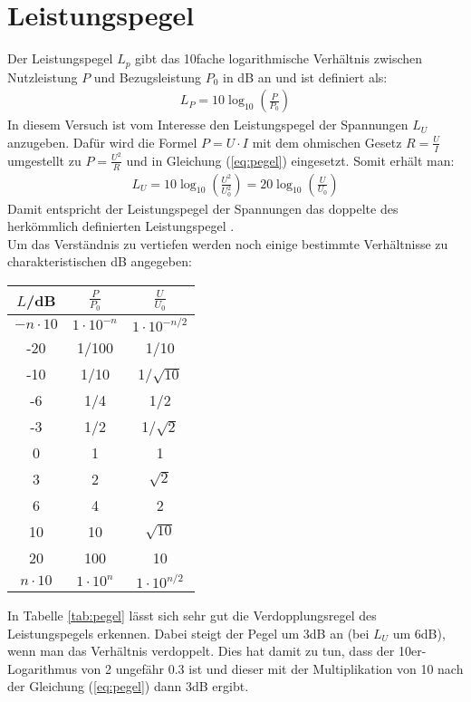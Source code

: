\section{Leistungspegel}
\label{sec:pegel}
Der Leistungspegel $L_p$ gibt das 10fache logarithmische Verhältnis zwischen Nutzleistung $P$ und Bezugsleistung $P_0$ in \si{\deci\bel} an und ist definiert als:
\begin{gather}
    L_P = 10 \log_{10}\left(\frac{P}{P_0}\right)
    \label{eq:pegel}
\end{gather}
In diesem Versuch ist vom Interesse den Leistungspegel der Spannungen $L_U$ anzugeben. Dafür wird die Formel $P = U \cdot I$ mit dem ohmischen Gesetz $R = \frac{U}{I}$ umgestellt zu $P = \frac{U^2}{R}$ und in Gleichung (\ref{eq:pegel}) eingesetzt. Somit erhält man:
\begin{gather}
    L_U = 10 \log_{10}\left(\frac{U^2}{U_0^2}\right) = 20 \log_{10}\left(\frac{U}{U_0}\right)
    \label{eq:spannungpegel}
\end{gather}
Damit entspricht der Leistungspegel der Spannungen das doppelte des herkömmlich definierten Leistungspegel \citep{electronik}.\\
Um das Verständnis zu vertiefen werden noch einige bestimmte Verhältnisse zu charakteristischen \si{\deci\bel} angegeben:
\begin{center}
    \begin{tabular}{c | c c}
        $L$/dB & $\frac{P}{P_0}$ & $\frac{U}{U_0}$\\
        \hline
        $-n\cdot10$ & $1\cdot10^{-n}$ &  $1\cdot10^{-n/2}$ \\
        -20 & 1/100 & 1/10 \\
        -10 & 1/10 & 1/$\sqrt{10}$ \\
        -6 & 1/4 & 1/2\\
        -3 & 1/2 & 1/$\sqrt{2}$\\
        0 & 1 & 1\\
        3 & 2 & $\sqrt{2}$\\
        6 & 4 & 2\\
        10 & 10 & $\sqrt{10}$ \\
        20 & 100 & 10 \\
        $n\cdot10$ & $1\cdot10^{n}$ &  $1\cdot10^{n/2}$ \\
    \end{tabular}
    \label{tab:pegel}
\end{center}
In Tabelle \ref{tab:pegel} lässt sich sehr gut die Verdopplungsregel des Leistungspegels erkennen. Dabei steigt der Pegel um 3dB an (bei $L_U$ um 6dB), wenn man das Verhältnis verdoppelt. Dies hat damit zu tun, dass der 10er-Logarithmus von 2 ungefähr 0.3 ist und dieser mit der Multiplikation von 10 nach der Gleichung (\ref{eq:pegel}) dann 3dB ergibt.
\newpage
